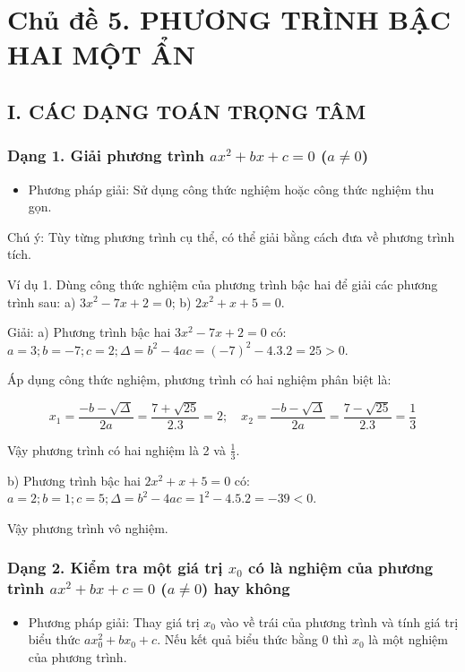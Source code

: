 \documentclass[%
    fontsize=12pt,%
    chapterprefix=false,%
    open=right,%
    twoside=false,%
    numbers=noenddot,%
    headings=optiontohead,%
    final,%
    DIV=15,%
    parskip=half %
]{scrbook}
\begin{document}
\section{Chủ đề 5. PHƯƠNG TRÌNH BẬC HAI MỘT ẨN}
\subsection{I. CÁC DẠNG TOÁN TRỌNG TÂM}
\subsubsection{Dạng 1. Giải phương trình $ ax^2 + bx + c = 0 $ ($ a \neq 0 $)}

\begin{itemize}
  \item Phương pháp giải: Sử dụng công thức nghiệm hoặc công thức nghiệm thu gọn.
\end{itemize}

Chú ý: Tùy từng phương trình cụ thể, có thể giải bằng cách đưa về phương trình tích.

Ví dụ 1. Dùng công thức nghiệm của phương trình bậc hai để giải các phương trình sau: a) $ 3x^2 - 7x + 2 = 0 $; b) $ 2x^2 + x + 5 = 0 $.

Giải: a) Phương trình bậc hai $ 3x^2 - 7x + 2 = 0 $ có: $ a = 3; b = -7; c = 2; \Delta = b^2 - 4ac = (-7)^2 - 4.3.2 = 25 > 0 $.

Áp dụng công thức nghiệm, phương trình có hai nghiệm phân biệt là:

\[
x_1 = \frac{-b - \sqrt{\Delta}}{2a} = \frac{7 + \sqrt{25}}{2.3} = 2; \quad x_2 = \frac{-b - \sqrt{\Delta}}{2a} = \frac{7 - \sqrt{25}}{2.3} = \frac{1}{3}
\]

Vậy phương trình có hai nghiệm là 2 và $ \frac{1}{3} $.

b) Phương trình bậc hai $ 2x^2 + x + 5 = 0 $ có: $ a = 2; b = 1; c = 5; \Delta = b^2 - 4ac = 1^2 - 4.5.2 = -39 < 0 $.

Vậy phương trình vô nghiệm.
\subsubsection{Dạng 2. Kiểm tra một giá trị $ x_0 $ có là nghiệm của phương trình $ ax^2 + bx + c = 0 $ ($ a \neq 0 $) hay không}

\begin{itemize}
  \item Phương pháp giải: Thay giá trị $ x_0 $ vào về trái của phương trình và tính giá trị biểu thức $ ax_0^2 + bx_0 + c $. Nếu kết quả biểu thức bằng 0 thì $ x_0 $ là một nghiệm của phương trình.
\end{itemize}
\end{document}
